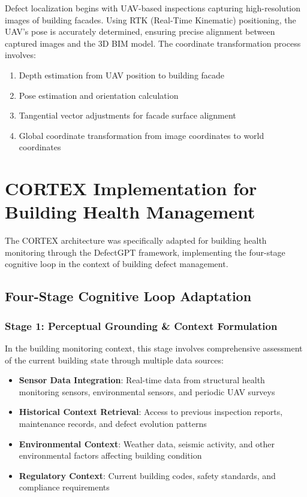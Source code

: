 Defect localization begins with UAV-based inspections capturing high-resolution images of building facades. Using RTK (Real-Time Kinematic) positioning, the UAV's pose is accurately determined, ensuring precise alignment between captured images and the 3D BIM model. The coordinate transformation process involves:

\begin{enumerate}
    \item Depth estimation from UAV position to building facade
    \item Pose estimation and orientation calculation
    \item Tangential vector adjustments for facade surface alignment
    \item Global coordinate transformation from image coordinates to world coordinates
\end{enumerate}

\section{CORTEX Implementation for Building Health Management}

The CORTEX architecture was specifically adapted for building health monitoring through the DefectGPT framework, implementing the four-stage cognitive loop in the context of building defect management.

\subsection{Four-Stage Cognitive Loop Adaptation}

\subsubsection{Stage 1: Perceptual Grounding \& Context Formulation}

In the building monitoring context, this stage involves comprehensive assessment of the current building state through multiple data sources:

\begin{itemize}
    \item \textbf{Sensor Data Integration}: Real-time data from structural health monitoring sensors, environmental sensors, and periodic UAV surveys
    \item \textbf{Historical Context Retrieval}: Access to previous inspection reports, maintenance records, and defect evolution patterns
    \item \textbf{Environmental Context}: Weather data, seismic activity, and other environmental factors affecting building condition
    \item \textbf{Regulatory Context}: Current building codes, safety standards, and compliance requirements
\end{itemize}

